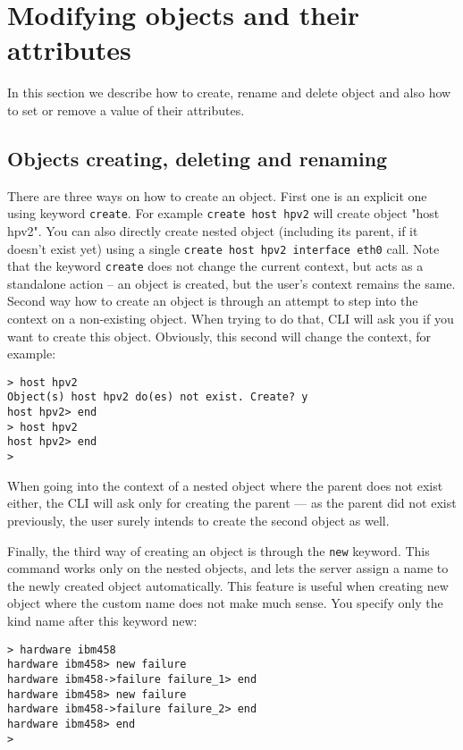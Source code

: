\documentclass[deska]{subfiles}
\begin{document}
\section{Modifying objects and their attributes}

In this section we describe how to create, rename and delete object and also how to set or remove a value of their
attributes.

\subsection{Objects creating, deleting and renaming}

There are three ways on how to create an object. First one is an explicit one using keyword {\tt create}. For example {\tt create
host hpv2} will create object "host hpv2". You can also directly create nested object (including its parent, if it
doesn't exist yet) using a single {\tt create host hpv2 interface eth0} call. Note that the keyword {\tt create} does not change
the current context, but acts as a standalone action -- an object is created, but the user's context remains the same.
Second way how to create an object is through an attempt to step into the context on a non-existing object.
When trying to do that, CLI will ask you if you want to create this object. Obviously, this second will change the
context, for example:

\begin{verbatim}
> host hpv2
Object(s) host hpv2 do(es) not exist. Create? y
host hpv2> end
> host hpv2
host hpv2> end
>
\end{verbatim}

When going into the context of a nested object where the parent does not exist either, the CLI will ask only for creating the
parent --- as the parent did not exist previously, the user surely intends to create the second object as well.

Finally, the third way of creating an object is through the {\tt new} keyword. This command works only on the nested
objects, and lets the server assign a name to the newly created object automatically. This feature is useful when creating
new object where the custom name does not make much sense. You specify only the kind name after this keyword new:

\begin{verbatim}
> hardware ibm458
hardware ibm458> new failure
hardware ibm458->failure failure_1> end
hardware ibm458> new failure
hardware ibm458->failure failure_2> end
hardware ibm458> end
>
\end{verbatim}
\end{document}
